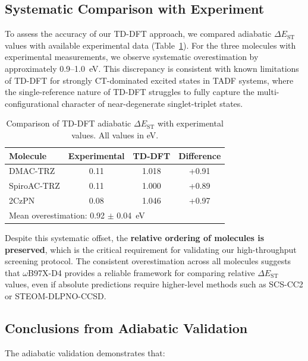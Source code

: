 \documentclass[journal=cmatex,manuscript=suppinfo,
keywords=true]{achemso}
\begin{document}
\subsection{Systematic Comparison with Experiment}

To assess the accuracy of our TD-DFT approach, we compared adiabatic $\Delta E_{\mathrm{ST}}$ values with available experimental data (Table~\ref{tab:experimental_comparison}). For the three molecules with experimental measurements, we observe systematic overestimation by approximately 0.9--1.0~eV. This discrepancy is consistent with known limitations of TD-DFT for strongly CT-dominated excited states in TADF systems,\cite{Penfold2018,Olivier2017} where the single-reference nature of TD-DFT struggles to fully capture the multi-configurational character of near-degenerate singlet-triplet states.

\begin{table}[H]
\centering
\caption{Comparison of TD-DFT adiabatic $\Delta E_{\mathrm{ST}}$ with experimental values. All values in eV.}
\label{tab:experimental_comparison}
\begin{tabular}{lccc}
\toprule
Molecule & Experimental & TD-DFT & Difference \\
\midrule
DMAC-TRZ & 0.11\cite{Uoyama2012} & 1.018 & +0.91 \\
SpiroAC-TRZ & 0.11\cite{Lee2013} & 1.000 & +0.89 \\
2CzPN & 0.08\cite{Kaji2015} & 1.046 & +0.97 \\
\midrule
\multicolumn{4}{l}{Mean overestimation: 0.92 $\pm$ 0.04~eV} \\
\bottomrule
\end{tabular}
\end{table}

Despite this systematic offset, the \textbf{relative ordering of molecules is preserved}, which is the critical requirement for validating our high-throughput screening protocol. The consistent overestimation across all molecules suggests that $\omega$B97X-D4 provides a reliable framework for comparing relative $\Delta E_{\mathrm{ST}}$ values, even if absolute predictions require higher-level methods such as SCS-CC2 or STEOM-DLPNO-CCSD.\cite{Samanta2017,Gibson2016}

\subsection{Conclusions from Adiabatic Validation}

The adiabatic validation demonstrates that:
\end{document}
